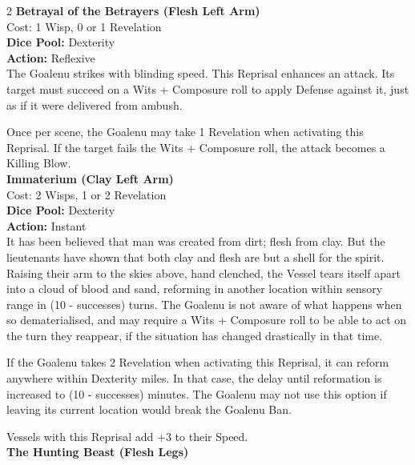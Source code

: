 \begin{multicols}{2}
\noindent\textbf{Betrayal of the Betrayers (Flesh Left Arm)}\\

\noindent Cost: 1 Wisp, 0 or 1 Revelation\\

\noindent\textbf{Dice Pool:} Dexterity\\

\noindent\textbf{Action:} Reflexive\\

\noindent The Goalenu strikes with blinding speed. This Reprisal enhances an attack. Its target must succeed on a Wits + Composure roll to apply Defense against it, just as if it were delivered from ambush.

Once per scene, the Goalenu may take 1 Revelation when activating this Reprisal. If the target fails the Wits + Composure roll, the attack becomes a Killing Blow.\\

\noindent\textbf{Immaterium (Clay Left Arm)}\\

\noindent Cost: 2 Wisps, 1 or 2 Revelation\\

\noindent\textbf{Dice Pool:} Dexterity\\

\noindent\textbf{Action:} Instant\\

\noindent It has been believed that man was created from dirt; flesh from clay. But the lieutenants have shown that both clay and flesh are but a shell for the spirit. Raising their arm to the skies above, hand clenched, the Vessel tears itself apart into a cloud of blood and sand, reforming in another location within sensory range in (10 - successes) turns. The Goalenu is not aware of what happens when so dematerialised, and may require a Wits + Composure roll to be able to act on the turn they reappear, if the situation has changed drastically in that time.

If the Goalenu takes 2 Revelation when activating this Reprisal, it can reform anywhere within Dexterity miles. In that case, the delay until reformation is increased to (10 - successes) minutes. The Goalenu may not use this option if leaving its current location would break the Goalenu Ban.

Vessels with this Reprisal add +3 to their Speed.\\

\noindent\textbf{The Hunting Beast (Flesh Legs)}\\


\end{multicols}
